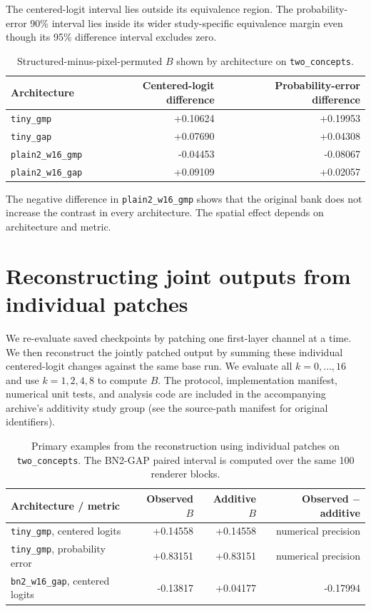 \documentclass[pdflatex,sn-basic]{sn-jnl}
\begin{document}
The centered-logit interval lies outside its equivalence region. The probability-error 90\% interval lies inside its wider study-specific equivalence margin even though its 95\% difference interval excludes zero.

\begin{table}[h]
\caption{Structured-minus-pixel-permuted $B$ shown by architecture on \texttt{two\_concepts}.}
\label{tab:supp-spatial-architectures}
\centering
\scriptsize
\begin{tabular}{lrr}
\toprule
Architecture & Centered-logit difference & Probability-error difference \\
\midrule
\texttt{tiny\_gmp} & +0.10624 & +0.19953 \\
\texttt{tiny\_gap} & +0.07690 & +0.04308 \\
\texttt{plain2\_w16\_gmp} & -0.04453 & -0.08067 \\
\texttt{plain2\_w16\_gap} & +0.09109 & +0.02057 \\
\bottomrule
\end{tabular}
\end{table}

The negative difference in \texttt{plain2\_w16\_gmp} shows that the original bank does not increase the contrast in every architecture. The spatial effect depends on architecture and metric.

\section{Reconstructing joint outputs from individual patches}\label{supp:additivity}

We re-evaluate saved checkpoints by patching one first-layer channel at a time. We then reconstruct the jointly patched output by summing these individual centered-logit changes against the same base run. We evaluate all $k=0,\ldots,16$ and use $k=1,2,4,8$ to compute $B$. The protocol, implementation manifest, numerical unit tests, and analysis code are included in the accompanying archive's additivity study group (see the source-path manifest for original identifiers).

\begin{table}[h]
\caption{Primary examples from the reconstruction using individual patches on \texttt{two\_concepts}. The BN2-GAP paired interval is computed over the same 100 renderer blocks.}
\label{tab:supp-additivity-examples}
\centering
\small
\begin{tabular}{lrrr}
\toprule
Architecture / metric & Observed $B$ & Additive $B$ & Observed $-$ additive \\
\midrule
\texttt{tiny\_gmp}, centered logits & +0.14558 & +0.14558 & numerical precision \\
\texttt{tiny\_gmp}, probability error & +0.83151 & +0.83151 & numerical precision \\
\texttt{bn2\_w16\_gap}, centered logits & -0.13817 & +0.04177 & -0.17994 \\
\bottomrule
\end{tabular}
\end{table}
\end{document}
